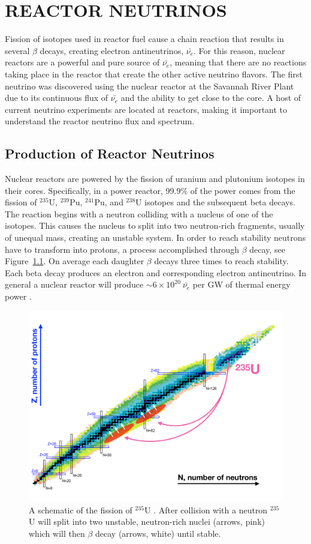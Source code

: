 \chapter{\uppercase{Reactor Neutrinos}}

Fission of isotopes used in reactor fuel cause a chain reaction that results in several  $\beta$ decays, creating electron antineutrinos, $\bar{\nu_{e}}$.
For this reason, nuclear reactors are a powerful and pure source of $\bar{\nu_{e}}$, meaning that there are no reactions taking place in the reactor that create the other active neutrino flavors.
The first neutrino was discovered using the nuclear reactor at the Savannah River Plant due to its continuous flux of $\bar{\nu_{e}}$ and the ability to get close to the core.
A host of current neutrino experiments are located at reactors, making it important to understand the reactor neutrino flux and spectrum. 

\section{Production of Reactor Neutrinos}

Nuclear reactors are powered by the fission of uranium and plutonium isotopes in their cores. 
Specifically, in a power reactor, 99.9\% of the power comes from the fission of $^{235}$U, $^{239}$Pu, $^{241}$Pu, and $^{238}$U isotopes and the subsequent beta decays.
The reaction begins with a neutron colliding with a nucleus of one of the isotopes. 
This causes the nucleus to split into two neutron-rich fragments, usually of unequal mass, creating an unstable system.
In order to reach stability neutrons have to transform into protons, a process accomplished through $\beta$ decay, see Figure~\ref{fig:nucchart}.
On average each daughter $\beta$ decays three times to reach stability.
Each beta decay produces an electron and corresponding electron antineutrino. 
In general a nuclear reactor will produce $\sim 6 \times 10^{20}~\bar{\nu_e}$ per GW of thermal energy power \cite{HayesVogel}.

\begin{figure}[h]
	\centering
	\includegraphics[width=0.7\linewidth]{tex/3-reactorneutrinos-images/NuclideChart_U235}
	\caption[Fission of $^{235}$U.]{A schematic of the fission of $^{235}$U \cite{NucChart}. After collision with a neutron $^{235}$U will split into two unstable, neutron-rich nuclei (arrows, pink) which will then $\beta$ decay (arrows, white) until stable.}
	\label{fig:nucchart}
\end{figure}


